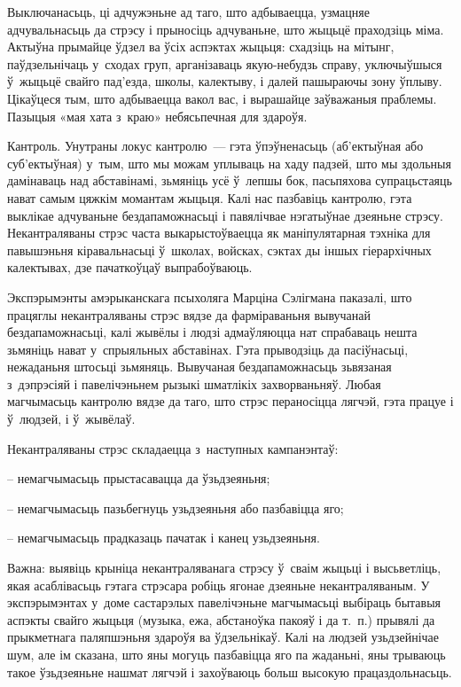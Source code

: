 Выключанасьць, ці адчужэньне ад таго, што адбываецца, узмацняе адчувальнасьць да стрэсу і прыносіць адчуваньне, што жыцьцё праходзіць міма. Актыўна прымайце ўдзел ва ўсіх аспэктах жыцьця: схадзіць на мітынг, паўдзельнічаць у~сходах груп, арганізаваць якую-небудзь справу, уключыўшыся ў~жыцьцё свайго пад'езда, школы, калектыву, і далей пашыраючы зону ўплыву. Цікаўцеся тым, што адбываецца вакол вас, і вырашайце заўважаныя праблемы. Пазыцыя «мая хата з~краю» небясьпечная для здароўя.

Кантроль. Унутраны локус кантролю~--- гэта ўпэўненасьць (аб'ектыўная або суб'ектыўная) у~тым, што мы можам уплываць на хаду падзей, што мы здольныя дамінаваць над абставінамі, зьмяніць усё ў~лепшы бок, пасьпяхова супрацьстаяць нават самым цяжкім момантам жыцьця. Калі нас пазбавіць кантролю, гэта выклікае адчуваньне бездапаможнасьці і павялічвае нэгатыўнае дзеяньне стрэсу. Некантраляваны стрэс часта выкарыстоўваецца як маніпулятарная тэхніка для павышэньня кіравальнасьці ў~школах, войсках, сэктах ды іншых гіерархічных калектывах, дзе пачаткоўцаў выпрабоўваюць.

Экспэрымэнты амэрыканскага псыхоляга Марціна Сэлігмана паказалі, што працяглы некантраляваны стрэс вядзе да фарміраваньня вывучанай бездапаможнасьці, калі жывёлы і людзі адмаўляюцца нат спрабаваць нешта зьмяніць нават у~спрыяльных абставінах. Гэта прыводзіць да пасіўнасьці, нежаданьня штосьці зьмяняць. Вывучаная бездапаможнасьць зьвязаная з~дэпрэсіяй і павелічэньнем рызыкі шматлікіх захворваньняў. Любая магчымасьць кантролю вядзе да таго, што стрэс пераносіцца лягчэй, гэта працуе і ў~людзей, і ў~жывёлаў.

Некантраляваны стрэс складаецца з~наступных кампанэнтаў: 

– немагчымасьць прыстасавацца да ўзьдзеяньня;

– немагчымасьць пазьбегнуць узьдзеяньня або пазбавіцца яго;

– немагчымасьць прадказаць пачатак і канец узьдзеяньня.

Важна: выявіць крыніца некантраляванага стрэсу ў~сваім жыцьці і высьветліць, якая асаблівасьць гэтага стрэсара робіць ягонае дзеяньне некантраляваным. У экспэрымэнтах у~доме састарэлых павелічэньне магчымасьці выбіраць бытавыя аспэкты свайго жыцьця (музыка, ежа, абстаноўка пакояў і да т.~п.) прывялі да прыкметнага паляпшэньня здароўя ва ўдзельнікаў. Калі на людзей узьдзейнічае шум, але ім сказана, што яны могуць пазбавіцца яго па жаданьні, яны трываюць такое ўзьдзеяньне нашмат лягчэй і захоўваюць больш высокую працаздольнасьць. 

